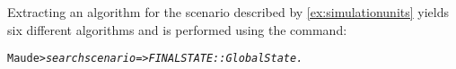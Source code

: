 \begin{example}
  Extracting an algorithm for the scenario described by \cref{ex:simulationunits} yields six different algorithms and is performed using the command:

  \small
  \begin{alltt}
Maude> \emph{search scenario => FINALSTATE::GlobalState .}
  \end{alltt}
  \normalsize





\end{example}
